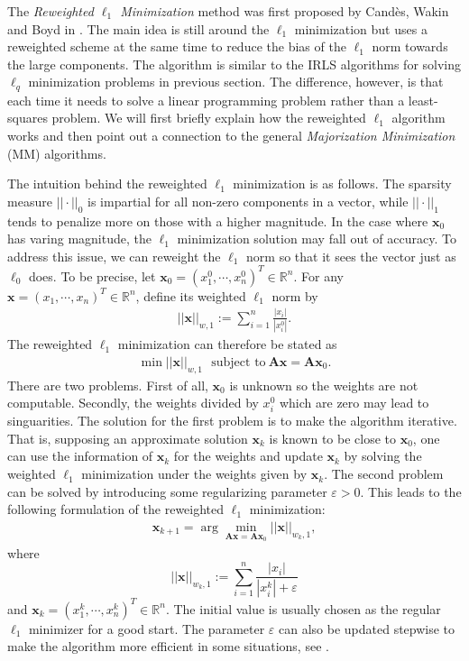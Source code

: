 \documentclass[11pt]{article}
\numberwithin{equation}{section}
\theoremstyle{plain}
\theoremstyle{definition}
\def\R{{\mathbb R}}
\def\R{{\mathbb R}}
\def\A{{\mathbf A}}
\def\x{{\mathbf x}}
\def\e{{\varepsilon}}
\begin{document}
The \emph{Reweighted $\ell_1$ Minimization} method was first proposed by Cand\`es, Wakin and Boyd in \cite{candes2008enhancing}. The main idea is still around the $\ell_1$ minimization but uses a reweighted scheme at the same time to reduce the bias of the $\ell_1$ norm towards the large components. The algorithm is similar to the IRLS algorithms for solving $\ell_q$ minimization problems in previous section. The difference, however, is that each time it needs to solve a linear programming problem rather than a least-squares problem. We will first briefly explain how the reweighted $\ell_1$ algorithm works and then point out a connection to the general \emph{Majorization Minimization} (MM) algorithms.

The intuition behind the reweighted $\ell_1$ minimization is as follows. The sparsity measure $|| \cdot||_0$ is impartial for all non-zero components in a vector, while $|| \cdot||_1$ tends to penalize more on those with a higher magnitude. In the case where $\x_0$ has varing magnitude, the $\ell_1$ minimization solution may fall out of accuracy. To address this issue, we can reweight the $\ell_1$ norm so that it sees the vector just as $\ell_0$ does. To be precise, let $\x_0=(x^0_1, \cdots, x^0_n)^T\in\R^n$. For any $\x = (x_1, 
\cdots, x_n)^T\in\R^n$, define its weighted $\ell_1$ norm by 
\begin{align*}
||\x||_{w,1}:=\sum_{i=1}^n\frac{|x_i|}{|x_i^0|}.
\end{align*} 
The reweighted $\ell_1$ minimization can therefore be stated as 
\begin{align}
\min ||\x||_{w,1} \ \ \ \text{subject to}\ \A\x=\A\x_0.
\end{align}
There are two problems. First of all, $\x_0$ is unknown so the weights are not computable. Secondly, the weights divided by $x^0_i$ which are zero may lead to singuarities. The solution for the first problem is to make the algorithm iterative. That is, supposing an approximate solution $\x_k$ is known to be close to $\x_0$, one can use the information of $\x_k$ for the weights and update $\x_k$ by solving the weighted $\ell_1$ minimization under the weights given by $\x_k$. The second problem can be solved by introducing some regularizing parameter $\e>0$. This leads to the following formulation of the reweighted $\ell_1$ minimization:
\begin{align}
\x_{k+1}=\arg\min_{\A\x=\A\x_0} ||\x||_{w_k,1},\label{re-l1}
\end{align}
where 
$$||\x||_{w_k,1}:=\sum_{i=1}^n\frac{|x_i|}{|x_i^k|+\e}$$
and $\x_k = (x_1^k, \cdots, x_n^k)^T\in\R^n$. The initial value is usually chosen as the regular $\ell_1$ minimizer for a good start. The parameter $\e$ can also be updated stepwise to make the algorithm more efficient in some situations, see \cite{candes2008enhancing}.
\end{document}
